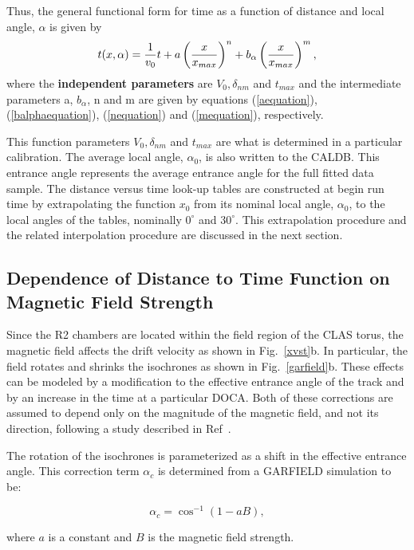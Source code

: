 \documentclass{article}
\begin{document}
Thus, the general functional form for time as a function of distance and local angle, $\alpha$
is given by
\begin{equation}
\label{tfunctionofxandlocalangle}
t(x,\alpha) = {1 \over v_0} t + a \left( {x \over x_{max}} \right)^n
+ b_\alpha \left( { x \over x_{max}} \right)^m,
\end{equation}
where the {\bf independent parameters} are {\bf $V_0, \delta_{nm}$} and {\bf $t_{max}$} and the intermediate
parameters a, $b_\alpha$, n and m are given by equations (\ref{aequation}), (\ref{balphaequation}), 
(\ref{nequation}) and (\ref{mequation}), respectively.

This function parameters {\bf $V_0, \delta_{nm}$} and {\bf $t_{max}$} are what is determined in a particular calibration.
The average local angle, $\alpha_0$, is also written to the CALDB.  
This entrance
angle represents the average entrance angle for the full fitted data sample.
The distance versus time look-up tables are constructed at begin run
time by extrapolating the function $x_0$ from its
nominal local angle, $\alpha_0$, to the local angles of the tables, 
nominally $0^\circ$ and $30^\circ$.  This extrapolation procedure and the related
interpolation procedure are discussed in the next section.

\subsection{Dependence of Distance to Time Function on Magnetic Field Strength}
Since the R2 chambers are located within the field region of the CLAS torus, the 
magnetic field affects the drift velocity as shown in 
Fig.~\ref{xvst}b.  In particular, the field rotates and shrinks the isochrones
as shown in Fig.~\ref{garfield}b.  These effects can be modeled by a 
modification to the effective entrance angle of the track and by an increase 
in the time at a particular DOCA.  Both of these corrections are assumed to depend only on the 
magnitude of the magnetic field, and not its direction, following a study 
described in Ref~\cite{MM-IEEE}.  

The rotation of the isochrones is parameterized as a shift in the effective
entrance angle.  This correction term $\alpha_c$ is determined from a 
GARFIELD simulation to be:

\begin{equation} 
\label{eq-bang}
\alpha_c = \cos^{-1}(1 - a B), 
\end{equation}

\noindent
where $a$ is a constant and $B$ is the magnetic field strength.
\end{document}

